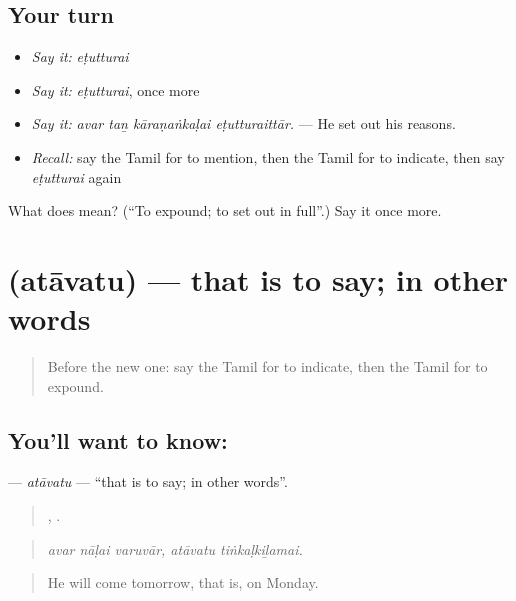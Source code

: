 \subsection*{Your turn}
\begin{itemize}
\raggedright
  \item \emph{Say it:} \emph{eṭutturai}
  \item \emph{Say it:} \emph{eṭutturai}, once more
  \item \emph{Say it:} \emph{avar taṉ kāraṇaṅkaḷai eṭutturaittār.} — He set out his reasons.
  \item \emph{Recall:} say the Tamil for to mention, then the Tamil for to indicate, then say \emph{eṭutturai} again
\end{itemize}

\begin{tcolorbox}[breakable,colback=teal!4,colframe=teal!35!black,title={Before you move on}]
What does  mean? (\textquotedblleft{}To expound; to set out in full\textquotedblright{}.) Say it once more.
\end{tcolorbox}
\section[\texorpdfstring{\ta{அதாவது} (atāvatu)}{அதாவது (atāvatu)}]{ (atāvatu) — that is to say; in other words}

\label{lesson:TA-C351-atavatu}



\begin{quote}
Before the new one: say the Tamil for to indicate, then the Tamil for to expound.
\end{quote}

\subsection*{You'll want to know: }
\textbf{} — \emph{atāvatu} — \textquotedblleft{}that is to say; in other words\textquotedblright{}.

\begin{quote}
  ,  .
\end{quote}

\begin{quote}
\emph{avar nāḷai varuvār, atāvatu tiṅkaḷkiḻamai.}
\end{quote}

\begin{quote}
He will come tomorrow, that is, on Monday.
\end{quote}

